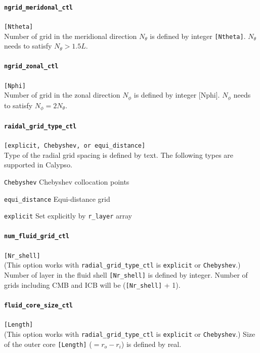 \paragraph{\tt ngrid\_meridonal\_ctl}
\label{href_t:ngrid_meridonal_ctl}
\verb|[Ntheta]| \\
Number of grid in the meridional direction $N_{\theta}$ is defined by integer \verb|[Ntheta]|. $N_{\theta}$ needs to satisfy $N_{\theta} > 1.5 L$.\paragraph{\tt ngrid\_zonal\_ctl}
\label{href_t:ngrid_zonal_ctl}
\verb|[Nphi]| \\
Number of grid in the zonal direction $N_{\phi}$ is defined by integer [Nphi]. $N_{\phi}$ needs to satisfy $N_{\phi} = 2 N_{\theta}$.

\paragraph{\tt raidal\_grid\_type\_ctl}
\label{href_t:radial_grid_type_ctl}
\verb|[explicit, Chebyshev, or equi_distance]| \\
Type of the radial grid spacing is defined by text. The following types are supported in Calypso.
%
\begin{description}
	\item{\tt Chebyshev} Chebyshev collocation points
	\item{\tt equi\_distance} Equi-distance grid
    \item{\tt explicit}  Set explicitly by \verb|r_layer| array
\end{description}
%

\paragraph{\tt num\_fluid\_grid\_ctl}
\label{href_t:num_fluid_grid_ctl}
\verb|[Nr_shell]| \\
(This option works with \verb|radial_grid_type_ctl| is {\tt explicit} or {\tt Chebyshev}.)
Number of layer in the fluid shell \verb|[Nr_shell]| is defined by integer. Number of grids including CMB and ICB will be (\verb|[Nr_shell]| + 1).

\paragraph{\tt fluid\_core\_size\_ctl}
\label{href_t:fluid_core_size_ctl}
\verb|[Length]| \\
(This option works with \verb|radial_grid_type_ctl| is {\tt explicit} or {\tt Chebyshev}.)
Size of the outer core \verb|[Length]| ($ = r_{o}-r_{i}$) is defined by real.

